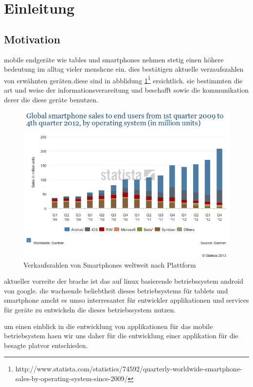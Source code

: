 \section{Einleitung}
\subsection{Motivation}
mobile endgeräte wie tables und smartphones nehmen stetig einen höhere bedeutung im alltag vieler menshcne ein. dies bestätigen aktuelle verzaufszahlen von erwähnten geräten.diese sind in abblidung \ref{sale1}\footnote{http://www.statista.com/statistics/74592/quarterly-worldwide-smartphone-sales-by-operating-system-since-2009/} ersichtlich. sie bestimmten die art und weise der informationsverareitung und beschafft sowie die kommunikation derer die diese geräte benutzen.

\begin{center}
\begin{figure}
\includegraphics[scale=0.6]{images/sale}
\caption{Verkaufszahlen von Smartphones weltweit nach Plattform}
\label{sale1}
\end{figure}
\end{center}

aktueller vorreite der brache ist das auf linux basierende betriebssystem android von google. die wachsende beliebtheit dieses betriebsystems für tablets und smartphone amcht es umso interresanter für entwickler applikationen und services für geräte zu entwickeln die dieses betriebssystem nutzen.

um einen einblick in die entwicklung von applikationen für das mobile betriebsystem haen wir uns daher für die entwicklung einer applikation für die besagte platvor entschieden.

